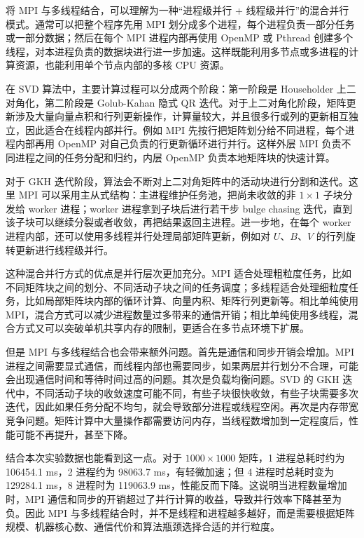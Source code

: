 \documentclass[UTF8,a4paper,12pt]{ctexart}
\begin{document}
将 MPI 与多线程结合，可以理解为一种“进程级并行 + 线程级并行”的混合并行模式。通常可以把整个程序先用 MPI 划分成多个进程，每个进程负责一部分任务或一部分数据；然后在每个 MPI 进程内部再使用 OpenMP 或 Pthread 创建多个线程，对本进程负责的数据块进行进一步加速。这样既能利用多节点或多进程的计算资源，也能利用单个节点内部的多核 CPU 资源。

在 SVD 算法中，主要计算过程可以分成两个阶段：第一阶段是 Householder 上二对角化，第二阶段是 Golub-Kahan 隐式 QR 迭代。对于上二对角化阶段，矩阵更新涉及大量向量点积和行列更新操作，计算量较大，并且很多行或列的更新相互独立，因此适合在线程内部并行。例如 MPI 先按行把矩阵划分给不同进程，每个进程内部再用 OpenMP 对自己负责的行更新循环进行并行。这样外层 MPI 负责不同进程之间的任务分配和归约，内层 OpenMP 负责本地矩阵块的快速计算。

对于 GKH 迭代阶段，算法会不断对上二对角矩阵中的活动块进行分割和迭代。这里 MPI 可以采用主从式结构：主进程维护任务池，把尚未收敛的非 $1\times1$ 子块分发给 worker 进程；worker 进程拿到子块后进行若干步 bulge chasing 迭代，直到该子块可以继续分裂或者收敛，再把结果返回主进程。进一步地，在每个 worker 进程内部，还可以使用多线程并行处理局部矩阵更新，例如对 $U$、$B$、$V$ 的行列旋转更新进行线程级并行。

这种混合并行方式的优点是并行层次更加充分。MPI 适合处理粗粒度任务，比如不同矩阵块之间的划分、不同活动子块之间的任务调度；多线程适合处理细粒度任务，比如局部矩阵块内部的循环计算、向量内积、矩阵行列更新等。相比单纯使用 MPI，混合方式可以减少进程数量过多带来的通信开销；相比单纯使用多线程，混合方式又可以突破单机共享内存的限制，更适合在多节点环境下扩展。

但是 MPI 与多线程结合也会带来额外问题。首先是通信和同步开销会增加。MPI 进程之间需要显式通信，而线程内部也需要同步，如果两层并行划分不合理，可能会出现通信时间和等待时间过高的问题。其次是负载均衡问题。SVD 的 GKH 迭代中，不同活动子块的收敛速度可能不同，有些子块很快收敛，有些子块需要多次迭代，因此如果任务分配不均匀，就会导致部分进程或线程空闲。再次是内存带宽竞争问题。矩阵计算中大量操作都需要访问内存，当线程数增加到一定程度后，性能可能不再提升，甚至下降。

结合本次实验数据也能看到这一点。对于 $1000\times1000$ 矩阵，1 进程总耗时约为 106454.1 ms，2 进程约为 98063.7 ms，有轻微加速；但 4 进程时总耗时变为 129284.1 ms，8 进程时为 119063.9 ms，性能反而下降。这说明当进程数量增加时，MPI 通信和同步的开销超过了并行计算的收益，导致并行效率下降甚至为负。因此 MPI 与多线程结合时，并不是线程和进程越多越好，而是需要根据矩阵规模、机器核心数、通信代价和算法瓶颈选择合适的并行粒度。
\end{document}

